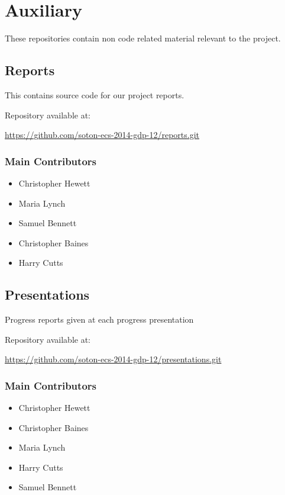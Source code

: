 \section{Auxiliary}

These repositories contain non code related material relevant to the project.

\subsection{Reports}
\label{Section:Repo_reports}

This contains source code for our project reports.

Repository available at:

\url{https://github.com/soton-ecs-2014-gdp-12/reports.git}

\subsubsection{Main Contributors}
\begin{itemize}
  \item Christopher Hewett
  \item Maria Lynch
  \item Samuel Bennett
  \item Christopher Baines  
  \item Harry Cutts
\end{itemize}

\subsection{Presentations}
\label{Section:Repo_presentations}

Progress reports given at each progress presentation

Repository available at:

\url{https://github.com/soton-ecs-2014-gdp-12/presentations.git}

\subsubsection{Main Contributors}
\begin{itemize}
  \item Christopher Hewett
  \item Christopher Baines
  \item Maria Lynch
  \item Harry Cutts
  \item Samuel Bennett
\end{itemize}

